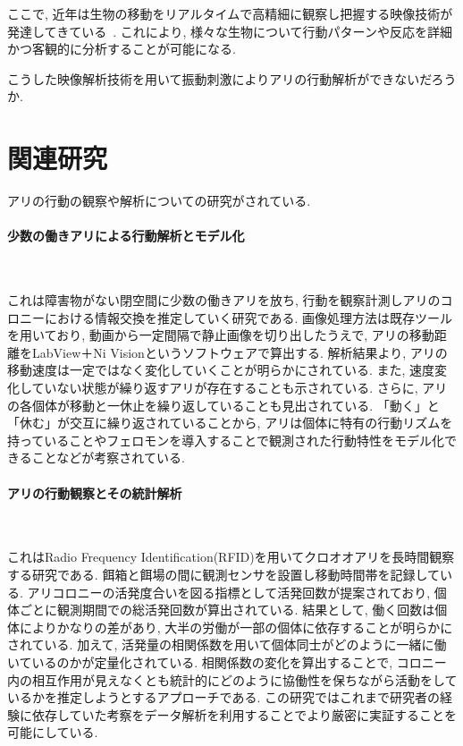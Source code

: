 ﻿\documentclass[a4paper, 12pt]{jsreport}
\begin{document}
ここで, 近年は生物の移動をリアルタイムで高精細に観察し把握する映像技術が発達してきている~\cite{4}. これにより, 様々な生物について行動パターンや反応を詳細かつ客観的に分析することが可能になる. 

こうした映像解析技術を用いて振動刺激によりアリの行動解析ができないだろうか. 
\section{関連研究}
\label{sec:thesis}
アリの行動の観察や解析についての研究がされている. 
\paragraph{少数の働きアリによる行動解析とモデル化}~\cite{5}

これは障害物がない閉空間に少数の働きアリを放ち, 行動を観察計測しアリのコロニーにおける情報交換を推定していく研究である. 画像処理方法は既存ツールを用いており, 動画から一定間隔で静止画像を切り出したうえで, アリの移動距離をLabView＋Ni Visionというソフトウェアで算出する. 解析結果より, アリの移動速度は一定ではなく変化していくことが明らかにされている. また, 速度変化していない状態が繰り返すアリが存在することも示されている. さらに, アリの各個体が移動と一休止を繰り返していることも見出されている. 「動く」と「休む」が交互に繰り返されていることから, アリは個体に特有の行動リズムを持っていることやフェロモンを導入することで観測された行動特性をモデル化できることなどが考察されている. 
\paragraph{アリの行動観察とその統計解析}~\cite{6}

これはRadio Frequency Identification(RFID)を用いてクロオオアリを長時間観察する研究である. 餌箱と餌場の間に観測センサを設置し移動時間帯を記録している. アリコロニーの活発度合いを図る指標として活発回数が提案されており, 個体ごとに観測期間での総活発回数が算出されている. 結果として, 働く回数は個体によりかなりの差があり, 大半の労働が一部の個体に依存することが明らかにされている. 加えて, 活発量の相関係数を用いて個体同士がどのように一緒に働いているのかが定量化されている. 相関係数の変化を算出することで, コロニー内の相互作用が見えなくとも統計的にどのように協働性を保ちながら活動をしているかを推定しようとするアプローチである. この研究ではこれまで研究者の経験に依存していた考察をデータ解析を利用することでより厳密に実証することを可能にしている. 
\end{document}
